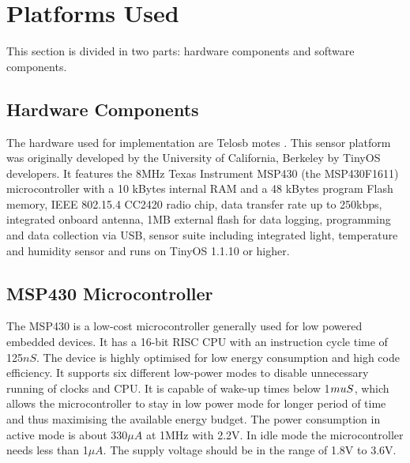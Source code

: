 \section{Platforms Used} \label{sec:PlatformsUsed}

This section is divided in two parts: hardware components and software components.

    \subsection{Hardware Components}
    
    The hardware used for implementation are Telosb motes \cite{datasheet:Telosb}. This sensor platform was originally developed by the University of California, Berkeley by TinyOS developers. It features the 8MHz Texas Instrument MSP430 (the MSP430F1611) microcontroller with a 10 kBytes internal RAM and a 48 kBytes program Flash memory, IEEE 802.15.4 CC2420 radio chip, data transfer rate up to 250kbps, integrated onboard antenna, 1MB external flash for data logging, programming and data collection via USB, sensor suite including integrated light,  temperature and humidity sensor and runs on TinyOS 1.1.10 or higher.
    
    \subsection*{MSP430 Microcontroller}
    
    The MSP430 \cite{website-MSP430} is a low-cost microcontroller generally used for low powered embedded devices. It has a 16-bit \ac{RISC} CPU with an instruction cycle time of 125$nS$. The device is highly optimised for low energy consumption and high code efficiency. It supports six different low-power modes to disable unnecessary running of clocks and CPU. It is capable of wake-up times below 1$\\muS$, which allows the microcontroller to stay in low power mode for longer period of time and thus maximising the available energy budget. The power consumption in active mode is about 330$\mu A$ at 1MHz with 2.2V. In idle mode the microcontroller needs less than 1$\mu A$. The supply voltage should be in the range of 1.8V to 3.6V.
    
